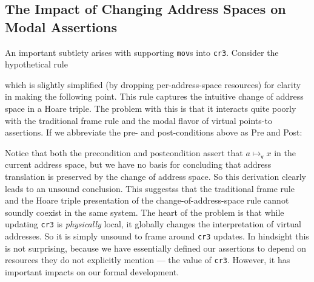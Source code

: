 \subsection{The Impact of Changing Address Spaces on Modal Assertions}
\label{sec:issues}
An important subtlety arises with supporting \lstinline|mov|s into \lstinline|cr3|. Consider the hypothetical rule
\begin{mathpar}
\end{mathpar}
which is slightly simplified (by dropping per-address-space resources) for clarity in making the following point.
This rule captures the intuitive change of address space in a Hoare triple.
The problem with this is that it interacts quite poorly with the traditional frame
rule and the modal flavor of virtual points-to assertions.
If we abbreviate the pre- and post-conditions above as \textsf{Pre} and \textsf{Post}:
\begin{mathpar}
\end{mathpar}
Notice that both the precondition and postcondition assert that $a\mapsto_\mathsf{v} x$ in the current address space, but we have no basis for concluding that address translation is preserved by the change of address space. So this derivation clearly leads to an unsound conclusion. 
This suggestss that the traditional frame rule and the Hoare triple presentation of the change-of-address-space rule cannot soundly coexist in the same system.
The heart of the problem is that while updating \lstinline|cr3| is \emph{physically} local, it globally changes the interpretation of virtual addresses. So it is simply unsound to frame around \lstinline|cr3| updates.
In hindsight this is not surprising, because we have essentially defined
our assertions to depend on resources they do not explicitly mention --- the value of \lstinline|cr3|.
However, it has important impacts on our formal development.


